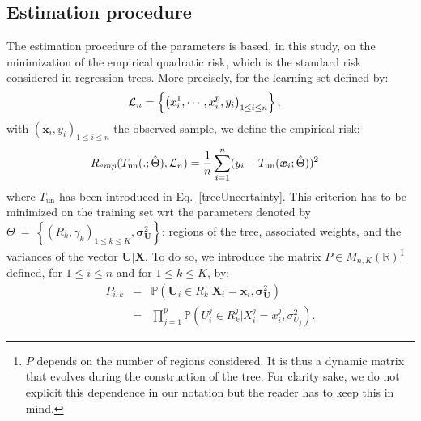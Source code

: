 \documentclass[twoside,11pt]{article}
\begin{document}
\subsection{Estimation procedure}

The estimation procedure of the parameters is based, in this study, on the minimization of the empirical quadratic risk, which is the standard risk considered in regression trees. More precisely, for the learning set defined by:
%
 \begin{align}
    {\cal L}_n&=\left\{\left(x_i^1,\cdots,x_i^{p} , y_i\right)_{1\leq i \leq n}
    \right\},
\label{learning_set}
\end{align}
%
with $(\boldsymbol{x}_i, y_i)_{1\leq i \leq n}$ the observed sample, we define the empirical risk:
%
\begin{align}
    R_{emp}(T_{\text{un}}(.;\hat{\Theta}), {\cal L}_n) &= 
    \frac{1}{n} \sum_{i=1}^n (y_i - T_{\text{un}}(\boldsymbol{x}_i;\hat{\Theta}))^2
\label{empiricalRisk}
\end{align}
%
where $T_{\text{un}}$ has been introduced in Eq.~\eqref{treeUncertainty}. This criterion has to be minimized on the training set wrt the parameters denoted by $\Theta~=~\left\{(R_k, \gamma_k)_{1\leq k \leq K},\boldsymbol{\sigma}_{\boldsymbol{U}}^2\right\} $: regions of the tree, associated weights, and the variances of  the vector $\boldsymbol{U|X}$. To do so, we introduce  the matrix $P \in M_{n,K} (\mathbb{R})$\footnote{$P$ depends on the number of regions considered. It is thus a dynamic matrix that evolves during the construction of the tree. For clarity sake, we do not explicit this dependence in our notation but the reader has to keep this in mind.} defined, for $1\leq i\leq n$ and for $1\leq k \leq K$, by:
%
\begin{eqnarray}\label{eq:def-P}
P_{i,k} & = &\mathbb{P}\left(\boldsymbol{U}_i \in R_{k}| \boldsymbol{X}_i = \boldsymbol{x}_i ,\boldsymbol{\sigma}_{\boldsymbol{U}}^2\right) \nonumber \\
 & = & \prod_{j=1}^{p} \mathbb{P}\left(U_i^j \in R_{k}^j| X^j_i = x^j_i,\sigma_{U_j}^2 \right). \nonumber
\end{eqnarray}
%
\end{document}
